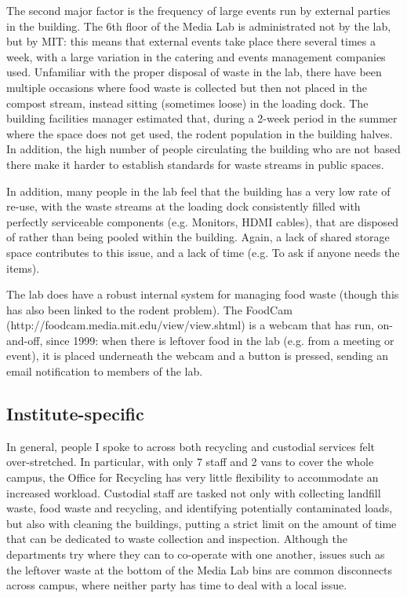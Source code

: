 \documentclass[nofonts,nols,justified,nobib]{tufte-book}
\begin{document}
The second major factor is the frequency of large events run by external parties in the building. The 6th floor of the Media Lab is administrated not by the lab, but by MIT: this means that external events take place there several times a week, with a large variation in the catering and events management companies used. Unfamiliar with the proper disposal of waste in the lab, there have been multiple occasions where food waste is collected but then not placed in the compost stream, instead sitting (sometimes loose) in the loading dock. The building facilities manager estimated that, during a 2-week period in the summer where the space does not get used, the rodent population in the building halves. In addition, the high number of people circulating the building who are not based there make it harder to establish standards for waste streams in public spaces.

In addition, many people in the lab feel that the building has a very low rate of re-use, with the waste streams at the loading dock consistently filled with perfectly serviceable components (e.g. Monitors, HDMI cables), that are disposed of rather than being pooled within the building. Again, a lack of shared storage space contributes to this issue, and a lack of time (e.g. To ask if anyone needs the items).

The lab does have a robust internal system for managing food waste (though this has also been linked to the rodent problem). The FoodCam (http://foodcam.media.mit.edu/view/view.shtml) is a webcam that has run, on-and-off, since 1999: when there is leftover food in the lab (e.g. from a meeting or event), it is placed underneath the webcam and a button is pressed, sending an email notification to members of the lab.

\subsection*{Institute-specific}

In general, people I spoke to across both recycling and custodial services felt over-stretched. In particular, with only 7 staff and 2 vans to cover the whole campus, the Office for Recycling has very little flexibility to accommodate an increased workload. Custodial staff are tasked not only with collecting landfill waste, food waste and recycling, and identifying potentially contaminated loads, but also with cleaning the buildings, putting a strict limit on the amount of time that can be dedicated to waste collection and inspection. Although the departments try where they can to co-operate with one another, issues such as the leftover waste at the bottom of the Media Lab bins are common disconnects across campus, where neither party has time to deal with a local issue.
\end{document}
